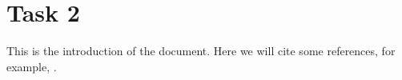\section{Task 2}
This is the introduction of the document. Here we will cite some references, for example, \cite{knuth1984texbook}.